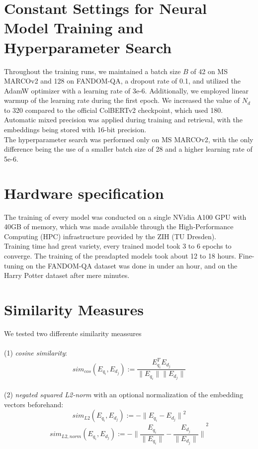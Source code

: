 \documentclass[11pt]{article}
\begin{document}
\section{Constant Settings for Neural Model Training and Hyperparameter Search}
\label{appendix:constsettings}
Throughout the training runs, we maintained a batch size $B$ of 42 on MS MARCOv2 and 128 on FANDOM-QA, a dropout rate of 0.1, and utilized the AdamW optimizer with a learning rate of  3e-6. Additionally, we employed linear warmup of the learning rate during the first epoch. We increased the value of $N_d$ to 320 compared to the official ColBERTv2 checkpoint, which used 180. Automatic mixed precision was applied during training and retrieval, with the embeddings being stored with 16-bit precision.
\\
The hyperparameter search was performed only on MS MARCOv2, with the only difference being the use of a smaller batch size of 28 and a higher learning rate of 5e-6.



\section{Hardware specification}
\label{appendix:hardware}
The training of every model was conducted on a single NVidia A100 GPU with 40GB of memory, which was made available through the High-Performance Computing (HPC) infrastructure provided by the ZIH (TU Dresden). 
\\
Training time had great variety, every trained model took 3 to 6 epochs to converge. The training of the preadapted models took about 12 to 18 hours. Fine-tuning on the FANDOM-QA dataset was done in under an hour, and on the Harry Potter dataset after mere minutes.

\section{Similarity Measures}
\label{appendix:similarity}
We tested two differente similarity meassures \\ \\
(1) \textit{cosine similarity}:
$$
sim_{cos}(E_{q_i}, E_{d_j}) := \frac{E_{q_i}^{T}E_{d_j} }{\| E_{q_i} \|\| E_{d_j} \|} 
$$ \\
(2) \textit{negated squared L2-norm} with an optional normalization of the embedding vectors beforehand:
$$
sim_{L2}(E_{q_i}, E_{d_j}) := -{\| E_{q_i} -E_{d_j} \|}^2
$$
$$
sim_{L2,norm}(E_{q_i}, E_{d_j}) := -{\| \frac{E_{q_i}}{\| E_{q_i} \|}  - \frac{E_{d_j}}{\| E_{d_j} \|} \|}^2
$$
\end{document}
